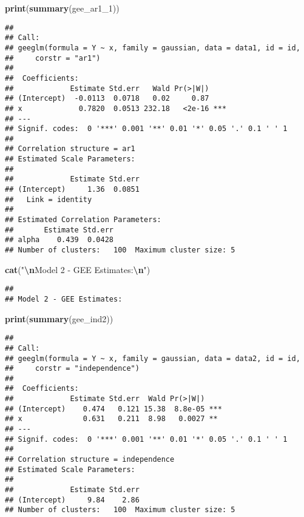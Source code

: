 \documentclass[
]{article}
\newenvironment{Shaded}{\begin{snugshade}}{\end{snugshade}}
\newcommand{\FunctionTok}[1]{\textcolor[rgb]{0.13,0.29,0.53}{\textbf{#1}}}
\newcommand{\NormalTok}[1]{#1}
\newcommand{\SpecialCharTok}[1]{\textcolor[rgb]{0.81,0.36,0.00}{\textbf{#1}}}
\newcommand{\StringTok}[1]{\textcolor[rgb]{0.31,0.60,0.02}{#1}}
\begin{document}
\begin{Shaded}
\begin{Highlighting}[]
\FunctionTok{print}\NormalTok{(}\FunctionTok{summary}\NormalTok{(gee\_ar1\_1))}
\end{Highlighting}
\end{Shaded}

\begin{verbatim}
## 
## Call:
## geeglm(formula = Y ~ x, family = gaussian, data = data1, id = id, 
##     corstr = "ar1")
## 
##  Coefficients:
##             Estimate Std.err   Wald Pr(>|W|)    
## (Intercept)  -0.0113  0.0718   0.02     0.87    
## x             0.7820  0.0513 232.18   <2e-16 ***
## ---
## Signif. codes:  0 '***' 0.001 '**' 0.01 '*' 0.05 '.' 0.1 ' ' 1
## 
## Correlation structure = ar1 
## Estimated Scale Parameters:
## 
##             Estimate Std.err
## (Intercept)     1.36  0.0851
##   Link = identity 
## 
## Estimated Correlation Parameters:
##       Estimate Std.err
## alpha    0.439  0.0428
## Number of clusters:   100  Maximum cluster size: 5
\end{verbatim}

\begin{Shaded}
\begin{Highlighting}[]
\FunctionTok{cat}\NormalTok{(}\StringTok{"}\SpecialCharTok{\textbackslash{}n}\StringTok{Model 2 {-} GEE Estimates:}\SpecialCharTok{\textbackslash{}n}\StringTok{"}\NormalTok{)}
\end{Highlighting}
\end{Shaded}

\begin{verbatim}
## 
## Model 2 - GEE Estimates:
\end{verbatim}

\begin{Shaded}
\begin{Highlighting}[]
\FunctionTok{print}\NormalTok{(}\FunctionTok{summary}\NormalTok{(gee\_ind2))}
\end{Highlighting}
\end{Shaded}

\begin{verbatim}
## 
## Call:
## geeglm(formula = Y ~ x, family = gaussian, data = data2, id = id, 
##     corstr = "independence")
## 
##  Coefficients:
##             Estimate Std.err  Wald Pr(>|W|)    
## (Intercept)    0.474   0.121 15.38  8.8e-05 ***
## x              0.631   0.211  8.98   0.0027 ** 
## ---
## Signif. codes:  0 '***' 0.001 '**' 0.01 '*' 0.05 '.' 0.1 ' ' 1
## 
## Correlation structure = independence 
## Estimated Scale Parameters:
## 
##             Estimate Std.err
## (Intercept)     9.84    2.86
## Number of clusters:   100  Maximum cluster size: 5
\end{verbatim}
\end{document}
